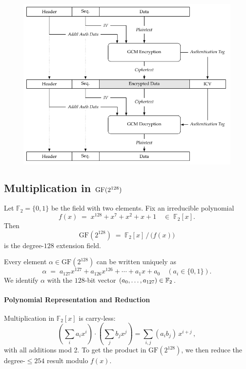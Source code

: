 
\begin{figure}[h!]\centering
\includegraphics[scale=1.25]{tikz/gcm_mode}
\end{figure}

\subsection{Multiplication in $\operatorname{GF}(2^{128})$}
\begin{definition}
	Let \(\mathbb F_2 = \{0,1\}\) be the field with two elements.  Fix an irreducible polynomial
	\[
	f(x) \;=\; x^{128} + x^7 + x^2 + x + 1 
	\quad\in\; \mathbb F_2[x].
	\]
	Then
	\[
	\mathrm{GF}(2^{128}) \;=\; \mathbb F_2[x] \,\big/\,\bigl(f(x)\bigr)
	\]
	is the degree-\(128\) extension field.
\end{definition}
\begin{remark}
Every element \(\alpha\in\mathrm{GF}(2^{128})\) can be written uniquely as \[
\alpha \;=\; a_{127}x^{127} + a_{126}x^{126} + \cdots + a_1 x + a_0
\quad(a_i\in\{0,1\}).
\] We identify \(\alpha\) with the \(128\)-bit vector \((a_{0},\dots,a_{127})\in\mathbb{F}_2\).
\end{remark}

\paragraph{Polynomial Representation and Reduction}
Multiplication in \(\mathbb F_2[x]\) is carry-less:
\[
\left(\sum_i a_i x^i\right)\cdot\left(\sum_j b_j x^j\right)
=\sum_{i,j}\left(a_i b_j\right)\,x^{i+j}\,,
\]
with all additions mod 2.  To get the product in \(\mathrm{GF}(2^{128})\), we then reduce
the degree-\(\le 254\) result modulo \(f(x)\).

